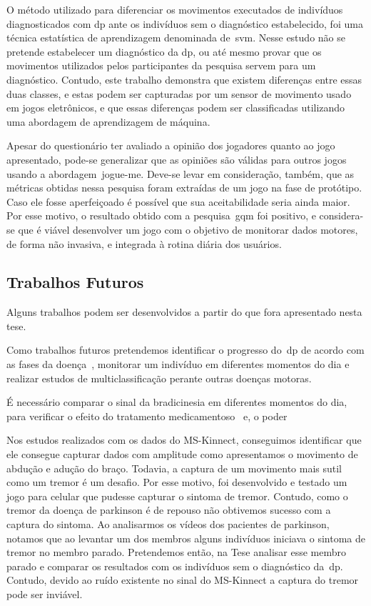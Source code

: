 O método utilizado para diferenciar os movimentos executados de indivíduos diagnosticados com \ac{dp} ante os indivíduos sem o diagnóstico estabelecido, foi uma técnica estatística de aprendizagem denominada de~\ac{svm}. Nesse estudo não se pretende estabelecer um diagnóstico da \ac{dp}, ou até mesmo provar que os movimentos utilizados pelos participantes da pesquisa servem para um diagnóstico. Contudo, este trabalho demonstra que existem diferenças entre essas duas classes, e estas podem ser capturadas por um sensor de movimento usado em jogos eletrônicos, e que essas diferenças podem ser classificadas utilizando uma abordagem de aprendizagem de máquina. 

Apesar do questionário ter avaliado a opinião dos jogadores quanto ao jogo apresentado, pode-se generalizar que as opiniões são válidas para outros jogos usando a abordagem~\ac{jogue-me}. Deve-se levar em consideração, também, que as métricas obtidas nessa pesquisa foram extraídas de um jogo na fase de protótipo. Caso ele fosse aperfeiçoado é possível que sua aceitabilidade seria ainda maior. Por esse motivo, o resultado obtido com a pesquisa~\ac{gqm} foi positivo, e considera-se que é viável desenvolver um jogo com o objetivo de monitorar dados motores, de forma não invasiva, e integrada à rotina diária dos usuários.


\subsection{Trabalhos Futuros}\label{sec:trab_futuros}

Alguns trabalhos podem ser desenvolvidos a partir do que fora apresentado nesta tese.

Como trabalhos futuros pretendemos identificar o progresso do~\ac{dp} de acordo com as fases da doença~\cite{protpar010}, monitorar um indivíduo em diferentes momentos do dia e realizar estudos de multiclassificação perante outras doenças motoras.

É necessário comparar o sinal da bradicinesia em diferentes momentos do dia, para verificar o efeito do tratamento medicamentoso~\cite{protpar010} e, o poder 

Nos estudos realizados com os dados do MS-Kinnect, conseguimos identificar que ele consegue capturar dados com amplitude como apresentamos o movimento de abdução e adução do braço. Todavia, a captura de um movimento mais sutil como um tremor é um desafio. Por esse motivo, foi desenvolvido e testado um jogo para celular que pudesse capturar o sintoma de tremor. Contudo, como o tremor da doença de parkinson é de repouso não obtivemos sucesso com a captura do sintoma. Ao analisarmos os vídeos dos pacientes de parkinson, notamos que ao levantar um dos membros alguns indivíduos iniciava o sintoma de tremor no membro parado. Pretendemos então, na Tese analisar esse membro parado e comparar os resultados com os indivíduos sem o diagnóstico da~\ac{dp}. Contudo, devido ao ruído existente no sinal do MS-Kinnect a captura do tremor pode ser inviável.



